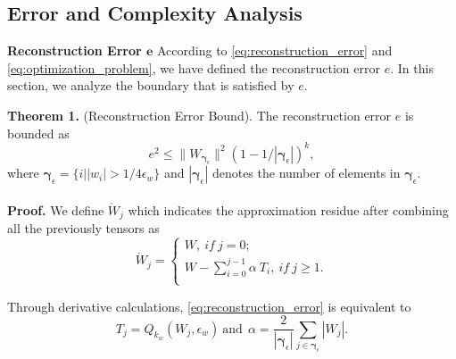 \documentclass[twoside,twocolumn]{article}
\begin{document}
\subsection{Error and Complexity Analysis}\label{sec:proof_section}
\noindent\textbf{Reconstruction Error $\boldsymbol{e}$} According to \eqref{eq:reconstruction_error} and \eqref{eq:optimization_problem}, we have defined the reconstruction error $e$. In this section, we analyze the boundary that is satisfied by $e$.

\noindent\textbf{Theorem 1.} (Reconstruction Error Bound). The reconstruction error $e$ is bounded as
\begin{equation}\label{eq:reconstruction error boundary}
e^2\leqslant \lVert W_{\boldsymbol{\gamma}_{\epsilon}} \rVert ^2\left( \text{1}-\text{1}/\left| \boldsymbol{\gamma}_{\epsilon} \right| \right) ^k,
\end{equation}
where $\boldsymbol{\gamma }_{\epsilon}=\{ i \big| | w_i |>1/4\epsilon _w\}$ and $\left| \boldsymbol{\gamma }_{\epsilon} \right|$ denotes the number of elements in $\boldsymbol{\gamma }_{\epsilon}$.
\\
\\
\noindent\textbf{Proof.} We define $\mathring{W}_j$ which indicates the approximation residue after combining all the previously tensors as
\begin{equation}\label{eq:approximation_residue_tensor}
\mathring{W}_j=\begin{cases}
	W,\ if\ j=\text{0;}\\
	W-\sum_{i=0}^{j-1}{\alpha\ T_i,\ if\ j\geqslant 1.}\\
\end{cases}
\end{equation}

Through derivative calculations, \eqref{eq:reconstruction_error} is equivalent to
\begin{equation}\label{eq:reconstruction_error_through_derivative_calculations}
T_j=Q_{k_w}\left( W_j,\epsilon _w \right) \ \text{and}\ \ \alpha=\frac{2}{\left| \boldsymbol{\gamma }_{\epsilon} \right|}\sum_{j\in \boldsymbol{\gamma }_{\epsilon}}{\left| W_j \right|}.
\end{equation}
\end{document}
